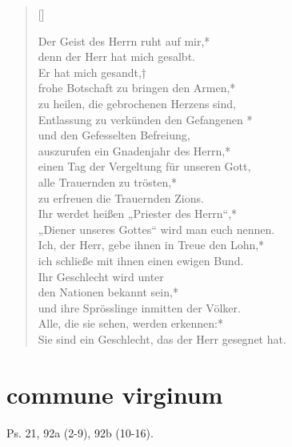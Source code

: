 \begin{verse}[\versewidth]
 


Der Geist des Herrn ruht auf mir,*\\
denn der Herr hat mich gesalbt.\\
\vin Er hat mich gesandt,†\\
\vin frohe Botschaft zu bringen den Armen,*\\
\vin zu heilen, die gebrochenen Herzens sind,\\
Entlassung zu verkünden den Gefangenen *\\
und den Gefesselten Befreiung, \\
\vin auszurufen ein Gnadenjahr des Herrn,*\\
\vin einen Tag der Vergeltung für unseren Gott,\\
alle Trauernden zu trösten,*\\
zu erfreuen die Trauernden Zions.\\
\vin Ihr werdet heißen „Priester des Herrn“,*\\
\vin „Diener unseres Gottes“ wird man euch nennen.\\
Ich, der Herr, gebe ihnen in Treue den Lohn,*\\
ich schließe mit ihnen einen ewigen Bund.\\
\vin Ihr Geschlecht wird unter \\ \vin den Nationen bekannt sein,*\\
\vin und ihre Sprösslinge inmitten der Völker.\\
Alle, die sie sehen, werden erkennen:*\\
Sie sind ein Geschlecht, das der Herr gesegnet hat.\\

 
 
\end{verse}




\section{commune virginum}

Ps. 21, 92a (2-9), 92b (10-16).\\

